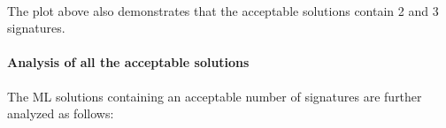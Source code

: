 \documentclass[11pt]{article}
\begin{document}
    \begin{center}
    \end{center}
    { \hspace*{\fill} \\}

    \begin{Verbatim}[commandchars=\\\{\}]

    \end{Verbatim}

    The plot above also demonstrates that the acceptable solutions contain 2
and 3 signatures.

\hypertarget{analysis-of-all-the-acceptable-solutions}{%
\paragraph{Analysis of all the acceptable
solutions}\label{analysis-of-all-the-acceptable-solutions}}

The ML solutions containing an acceptable number of signatures are
further analyzed as follows:
\end{document}
